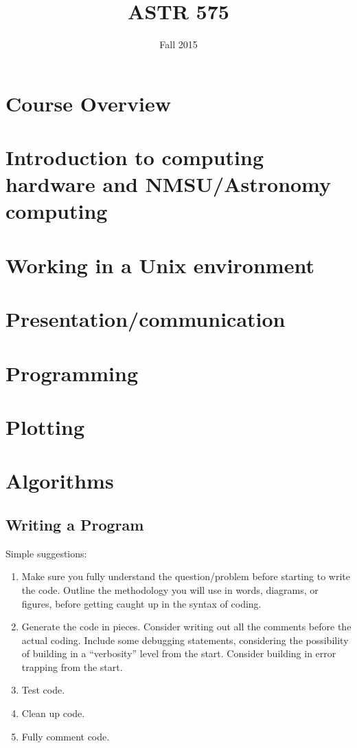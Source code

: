 \documentclass[12pt]{article}
\title{ASTR 575}
\date{Fall 2015}
\begin{document}
\maketitle

\section{Course Overview}
\section{Introduction to computing hardware and NMSU/Astronomy computing}
\section{Working in a Unix environment}
\section{Presentation/communication}
\section{Programming}
\section{Plotting}
\section{Algorithms}

\subsection{Writing a Program}
Simple suggestions:
\begin{enumerate}
    \item Make sure you fully understand the question/problem before starting
        to write the code. Outline the methodology you will use in words, diagrams,
        or figures, before getting caught up in the syntax of coding.
    \item Generate the code in pieces. Consider writing out all the comments
        before the actual coding. Include some debugging statements, considering
        the possibility of building in a ``verbosity'' level from the start.
        Consider building in error trapping from the start.
    \item Test code.
    \item Clean up code.
    \item Fully comment code.
\end{enumerate}
\end{document}
